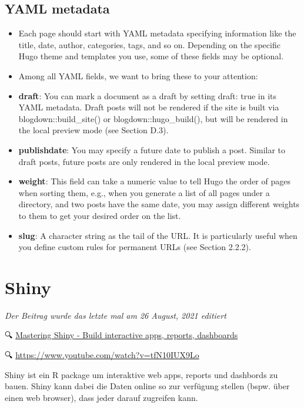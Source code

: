 \documentclass[
]{article}
\providecommand{\tightlist}{%
  \setlength{\itemsep}{0pt}\setlength{\parskip}{0pt}}
\begin{document}
\hypertarget{yaml-metadata}{%
\subsection{YAML metadata}\label{yaml-metadata}}

\begin{itemize}
\tightlist
\item
  Each page should start with YAML metadata specifying information
  like the title, date, author, categories, tags, and so on. Depending
  on the specific Hugo theme and templates you use, some of these
  fields may be optional.
\item
  Among all YAML fields, we want to bring these to your attention:
\item
  \textbf{draft}: You can mark a document as a draft by setting draft: true
  in its YAML metadata. Draft posts will not be rendered if the site
  is built via blogdown::build\_site() or blogdown::hugo\_build(), but
  will be rendered in the local preview mode (see Section D.3).
\item
  \textbf{publishdate}: You may specify a future date to publish a post.
  Similar to draft posts, future posts are only rendered in the local
  preview mode.
\item
  \textbf{weight}: This field can take a numeric value to tell Hugo the
  order of pages when sorting them, e.g., when you generate a list of
  all pages under a directory, and two posts have the same date, you
  may assign different weights to them to get your desired order on
  the list.
\item
  \textbf{slug}: A character string as the tail of the URL. It is
  particularly useful when you define custom rules for permanent URLs
  (see Section 2.2.2).
\end{itemize}

\hypertarget{shiny}{%
\section{Shiny}\label{shiny}}

\emph{Der Beitrag wurde das letzte mal am 26 August, 2021 editiert}

🔍 \href{https://mastering-shiny.org/index.html}{Mastering Shiny - Build interactive apps, reports, dashboards}

🔍 \url{https://www.youtube.com/watch?v=tfN10IUX9Lo}

Shiny ist ein R package um interaktive web apps, reports und dashbords zu bauen. Shiny kann dabei die Daten online so zur verfügung stellen (bspw. über einen web browser), dass jeder darauf zugreifen kann.
\end{document}
